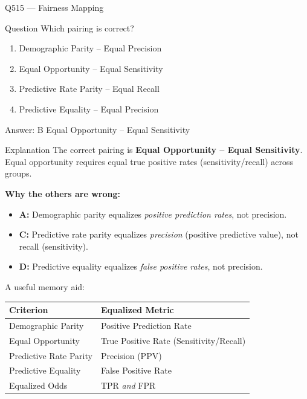 \documentclass[aspectratio=169,8pt]{beamer}
\begin{document}
\begin{frame}{Q515 --- Fairness Mapping}
	\begin{block}{Question}
		Which pairing is correct?
		\begin{enumerate}
			\item Demographic Parity -- Equal Precision
			\item Equal Opportunity -- Equal Sensitivity
			\item Predictive Rate Parity -- Equal Recall
			\item Predictive Equality -- Equal Precision
		\end{enumerate}
	\end{block}
	\begin{exampleblock}{Answer: B}
		Equal Opportunity -- Equal Sensitivity
	\end{exampleblock}
	\begin{block}{Explanation}
		The correct pairing is \textbf{Equal Opportunity -- Equal Sensitivity}.
		Equal opportunity requires equal true positive rates (sensitivity/recall)
		across groups.
		
		\textbf{Why the others are wrong:}
		\begin{itemize}
			\item \textbf{A:} Demographic parity equalizes \emph{positive prediction rates},
			not precision.
			\item \textbf{C:} Predictive rate parity equalizes \emph{precision}
			(positive predictive value), not recall (sensitivity).
			\item \textbf{D:} Predictive equality equalizes \emph{false positive rates},
			not precision.
		\end{itemize}
		A useful memory aid:
		\begin{center}
			\begin{tabular}{ll}
				\textbf{Criterion} & \textbf{Equalized Metric} \\
				\hline
				Demographic Parity & Positive Prediction Rate \\
				Equal Opportunity & True Positive Rate (Sensitivity/Recall) \\
				Predictive Rate Parity & Precision (PPV) \\
				Predictive Equality & False Positive Rate \\
				Equalized Odds & TPR \emph{and} FPR \\
			\end{tabular}
		\end{center}
	\end{block}
\end{frame}
\end{document}
